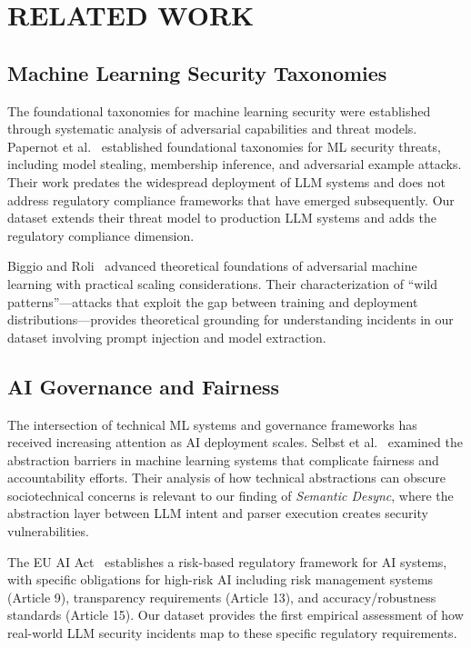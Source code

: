 \documentclass[10pt,conference]{IEEEtran}
\begin{document}
\section{RELATED WORK}
\label{sec:related-work}

\subsection{Machine Learning Security Taxonomies}

The foundational taxonomies for machine learning security were established through systematic analysis of adversarial capabilities and threat models. Papernot et al.~\cite{papernot2019} established foundational taxonomies for ML security threats, including model stealing, membership inference, and adversarial example attacks. Their work predates the widespread deployment of LLM systems and does not address regulatory compliance frameworks that have emerged subsequently. Our dataset extends their threat model to production LLM systems and adds the regulatory compliance dimension.

Biggio and Roli~\cite{biggio2018} advanced theoretical foundations of adversarial machine learning with practical scaling considerations. Their characterization of ``wild patterns''---attacks that exploit the gap between training and deployment distributions---provides theoretical grounding for understanding incidents in our dataset involving prompt injection and model extraction.

\subsection{AI Governance and Fairness}

The intersection of technical ML systems and governance frameworks has received increasing attention as AI deployment scales. Selbst et al.~\cite{selbst2018} examined the abstraction barriers in machine learning systems that complicate fairness and accountability efforts. Their analysis of how technical abstractions can obscure sociotechnical concerns is relevant to our finding of \emph{Semantic Desync}, where the abstraction layer between LLM intent and parser execution creates security vulnerabilities.

The EU AI Act~\cite{euaiact2024} establishes a risk-based regulatory framework for AI systems, with specific obligations for high-risk AI including risk management systems (Article 9), transparency requirements (Article 13), and accuracy/robustness standards (Article 15). Our dataset provides the first empirical assessment of how real-world LLM security incidents map to these specific regulatory requirements.
\end{document}
